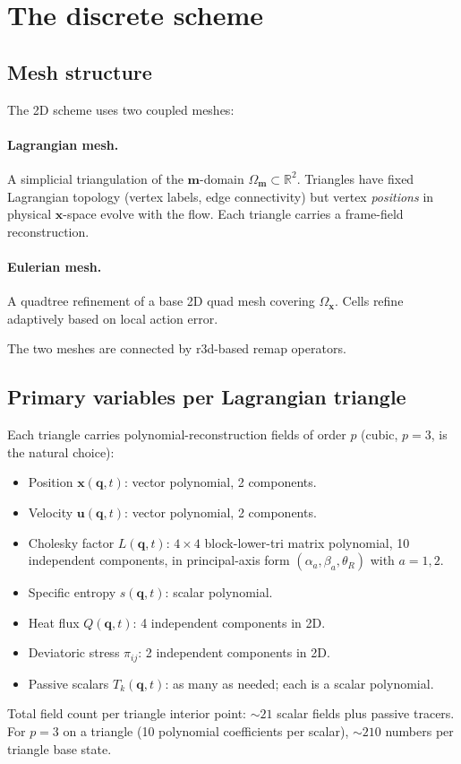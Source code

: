 \documentclass[11pt]{article}
\newcommand{\bx}{\bm{x}}
\newcommand{\bu}{\bm{u}}
\newcommand{\bmlab}{\bm{m}}
\newcommand{\bq}{\bm{q}}
\begin{document}
\section{The discrete scheme}
\label{sec:discrete}

\subsection{Mesh structure}

The 2D scheme uses two coupled meshes:

\paragraph{Lagrangian mesh.} A simplicial triangulation of the
$\bmlab$-domain $\Omega_{\bmlab}\subset\mathbb{R}^2$. Triangles have fixed
Lagrangian topology (vertex labels, edge connectivity) but vertex
\emph{positions} in physical $\bx$-space evolve with the flow. Each
triangle carries a frame-field reconstruction.

\paragraph{Eulerian mesh.} A quadtree refinement of a base 2D quad
mesh covering $\Omega_{\bx}$. Cells refine adaptively based on local
action error.

The two meshes are connected by r3d-based remap operators.

\subsection{Primary variables per Lagrangian triangle}

Each triangle carries polynomial-reconstruction fields of order $p$
(cubic, $p=3$, is the natural choice):
\begin{itemize}
\item Position $\bx(\bq,t)$: vector polynomial, 2 components.
\item Velocity $\bu(\bq,t)$: vector polynomial, 2 components.
\item Cholesky factor $L(\bq,t)$: $4\times 4$ block-lower-tri matrix
polynomial, 10 independent components, in principal-axis form
$(\alpha_a, \beta_a, \theta_R)$ with $a=1,2$.
\item Specific entropy $s(\bq,t)$: scalar polynomial.
\item Heat flux $Q(\bq,t)$: 4 independent components in 2D.
\item Deviatoric stress $\pi_{ij}$: 2 independent components in 2D.
\item Passive scalars $T_k(\bq,t)$: as many as needed; each is a
scalar polynomial.
\end{itemize}
Total field count per triangle interior point: $\sim 21$ scalar
fields plus passive tracers. For $p=3$ on a triangle (10 polynomial
coefficients per scalar), $\sim 210$ numbers per triangle base state.
\end{document}
